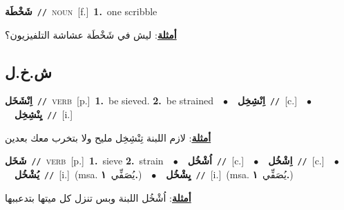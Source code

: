 \documentclass[10pt,a4paper,twoside]{article} %
\begin{document}
\begin{multicols}{2}
{\setlength\topsep{0pt}\textbf{\foreignlanguage{arabic}{شَخْطَة}}\ {\color{gray}\texttt{//}\color{black}}\ \textsc{noun}\ [f.]\ \textbf{1.}~one scribble\  \begin{flushright}\color{gray}\foreignlanguage{arabic}{\textbf{\underline{\foreignlanguage{arabic}{أمثلة}}}: ليش في شَخْطَة عشاشة التلفيزيون؟}\end{flushright}\color{black}} \vspace{2mm}

\vspace{-3mm}
\subsection*{\color{blue}\foreignlanguage{arabic}{ش.خ.ل}\color{blue}{}} 

{\setlength\topsep{0pt}\textbf{\foreignlanguage{arabic}{اِنْشَخَل}}\ {\color{gray}\texttt{//}\color{black}}\ \textsc{verb}\ [p.]\ \textbf{1.}~be sieved.  \textbf{2.}~be strained\ \ $\bullet$\ \ \setlength\topsep{0pt}\textbf{\foreignlanguage{arabic}{اِنْشِخِل}}\ {\color{gray}\texttt{//}\color{black}}\ [c.]\ \ $\bullet$\ \ \setlength\topsep{0pt}\textbf{\foreignlanguage{arabic}{يِنْشِخِل}}\ {\color{gray}\texttt{//}\color{black}}\ [i.]\  \begin{flushright}\color{gray}\foreignlanguage{arabic}{\textbf{\underline{\foreignlanguage{arabic}{أمثلة}}}: لازم اللبنة تِنْشِخِل مليح ولا بتخرب معك بعدين}\end{flushright}\color{black}} \vspace{2mm}

{\setlength\topsep{0pt}\textbf{\foreignlanguage{arabic}{شَخَل}}\ {\color{gray}\texttt{//}\color{black}}\ \textsc{verb}\ [p.]\ \textbf{1.}~sieve  \textbf{2.}~strain\ \ $\bullet$\ \ \setlength\topsep{0pt}\textbf{\foreignlanguage{arabic}{اُشْخُل}}\ {\color{gray}\texttt{//}\color{black}}\ [c.]\ \ $\bullet$\ \ \setlength\topsep{0pt}\textbf{\foreignlanguage{arabic}{اِشْخُل}}\ {\color{gray}\texttt{//}\color{black}}\ [c.]\ \ $\bullet$\ \ \setlength\topsep{0pt}\textbf{\foreignlanguage{arabic}{يُشْخُل}}\ {\color{gray}\texttt{//}\color{black}}\ [i.]\ \color{gray}(msa. \foreignlanguage{arabic}{يُصَفِّي}~\foreignlanguage{arabic}{\textbf{١.}})\color{black}\ \ $\bullet$\ \ \setlength\topsep{0pt}\textbf{\foreignlanguage{arabic}{يِشْخُل}}\ {\color{gray}\texttt{//}\color{black}}\ [i.]\ \color{gray}(msa. \foreignlanguage{arabic}{يُصَفِّي}~\foreignlanguage{arabic}{\textbf{١.}})\color{black}\  \begin{flushright}\color{gray}\foreignlanguage{arabic}{\textbf{\underline{\foreignlanguage{arabic}{أمثلة}}}: اُشْخُل اللبنة وبس تنزل كل ميتها بتدعببها}\end{flushright}\color{black}} \vspace{2mm}


\end{multicols}
\end{document}
